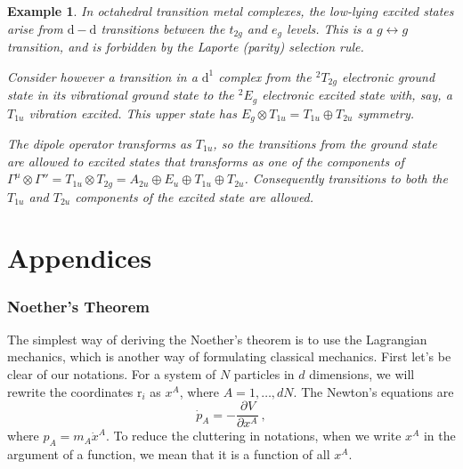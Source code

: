 \documentclass{article}
\theoremstyle{plain}\theoremheaderfont{\normalfont\itshape}\theorembodyfont{\rmfamily}\theoremseparator{.}\newtheorem*{rem}{Remark}\newtheorem*{ex}{Example}\newtheorem*{proof}{Proof}\newtheorem*{altp}{Alternative proof}
\theoremstyle{plain}\theoremheaderfont{\normalfont\bfseries}\theorembodyfont{\rmfamily}\theoremseparator{.}\newtheorem{thm}{Theorem}[section]\newtheorem{lem}[thm]{Lemma}\newtheorem{prop}[thm]{Proposition}\newtheorem*{cor}{Corollary}\newtheorem{defn}[thm]{Definition}\newtheorem{clm}[thm]{Claim}\newtheorem{clminproof}{Claim}\newtheorem*{law}{Law}\newtheorem{pos}[thm]{Postulate}
\theoremstyle{break}\theoremheaderfont{\normalfont\itshape}\theorembodyfont{\rmfamily}\theoremseparator{.\medskip}\newtheorem*{proofskip}{Proof}\newtheorem*{exs}{Examples}\newtheorem*{rems}{Remarks}
\theoremstyle{break}\theoremheaderfont{\normalfont\bfseries}\theorembodyfont{\rmfamily}\theoremseparator{.\medskip}\newtheorem{lemskip}[thm]{Lemma}\newtheorem{defnskip}[thm]{Definition}\newtheorem{propskip}[thm]{Proposition}\newtheorem{thmskip}[thm]{Theorem}
\numberwithin{equation}{section}
\newcommand{\pdv}[3][]{\frac{\partial^{#1} #2}{{\partial #3}^{#1}}}
\newcommand{\vb}[1]{\bm{\mathrm{#1}}}
\begin{document}
    \begin{ex}
        In octahedral transition metal complexes, the low-lying excited states arise from \(\mathrm{d}-\mathrm{d}\) transitions between the \(t_{2g}\) and \(e_g\) levels. This is a \(g\leftrightarrow g\) transition, and is forbidden by the Laporte (parity) selection rule.

        Consider however a transition in a \(\mathrm{d}^1\) complex from the \(^2T_{2g}\) electronic ground state in its vibrational ground state to the \(^2E_g\) electronic excited state with, say, a \(T_{1u}\) vibration excited. This upper state has \(E_g\otimes T_{1u}= T_{1u}\oplus T_{2u}\) symmetry.

        The dipole operator transforms as \(T_{1u}\), so the transitions from the ground state are allowed to excited states that transforms as one of the components of \(\Gamma^{\mu}\otimes\Gamma''=T_{1u}\otimes T_{2g}=A_{2u}\oplus E_{u}\oplus T_{1u}\oplus T_{2u}\). Consequently transitions to both the \(T_{1u}\) and \(T_{2u}\) components of the excited state are allowed.

        \begin{figure}[ht!]
            \centering
        \end{figure}
    \end{ex}


    \newpage
    \part*{Appendices}
    \appendix

    \section{Noether's Theorem}\label{Appendix:Noether}
    The simplest way of deriving the Noether's theorem is to use the Lagrangian mechanics, which is another way of formulating classical mechanics. First let's be clear of our notations. For a system of \(N\) particles in \(d\) dimensions, we will rewrite the coordinates \(\vb{r}_i\) as \(x^A\), where \(A=1,\dots,dN\). The Newton's equations are
    \begin{equation}\label{Newtons_eqn}
        \dot{p}_A=-\pdv{V}{x^A}\,,
    \end{equation}
    where \(p_A=m_A\dot{x}^A\). To reduce the cluttering in notations, when we write \(x^A\) in the argument of a function, we mean that it is a function of all \(x^A\).
    
\end{document}
